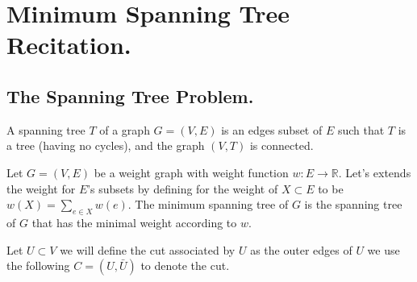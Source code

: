 


\ifdefined\BOOK
\else
\setcounter{chapter}{10}
\fi
\chapter{Minimum Spanning Tree Recitation.} 


\section{The Spanning Tree Problem.}


\begin{definition}
  A spanning tree $T$ of a graph $G=(V,E)$ is an edges subset of $E$ such that $T$ is a tree (having no cycles), and the graph $(V,T)$ is connected.   
\end{definition}

\begin{problem}[MST] Let $G = (V,E)$ be a weight graph with weight function $w : E \rightarrow \mathbb{R}$. Let's extends the weight for $E$'s subsets by defining for the weight of $X\subset E$ to be $w(X)= \sum_{e \in X}w(e)$. The minimum spanning tree of $G$ is the spanning tree of $G$ that has the minimal weight according to $w$.
\end{problem}

\begin{definition}
  Let $U \subset V$ we will define the cut associated by $U$ as the outer edges of $U$ we use the following $C = (U, \bar{U})$ to denote the cut. 
\end{definition} 



